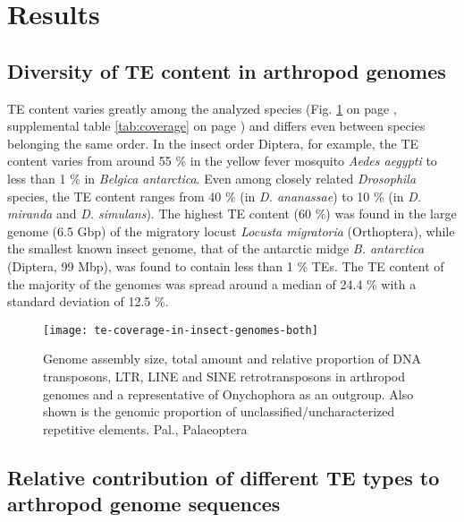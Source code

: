 \section{Results}\label{results}

\subsection{Diversity of TE content in arthropod
genomes}\label{diversity-of-te-content-in-arthropod-genomes}

TE content varies greatly among the analyzed species (Fig.
\ref{fig:te-coverage} on page \pageref{fig:te-coverage}, supplemental
table \ref{tab:coverage} on page \pageref{tab:coverage}) and differs
even between species belonging the same order. In the insect order
Diptera, for example, the TE content varies from around 55 \% in the
yellow fever mosquito \emph{Aedes aegypti} to less than 1 \% in
\emph{Belgica antarctica}. Even among closely related \emph{Drosophila}
species, the TE content ranges from 40 \% (in \emph{D. ananassae}) to 10
\% (in \emph{D. miranda} and \emph{D.  simulans}). The highest TE
content (60 \%) was found in the large genome (6.5 Gbp) of the migratory
locust \emph{Locusta migratoria} (Orthoptera), while the smallest known
insect genome, that of the antarctic midge \emph{B. antarctica}
(Diptera, 99 Mbp), was found to contain less than 1 \% TEs. The TE
content of the majority of the genomes was spread around a median of
24.4 \% with a standard deviation of 12.5 \%.

\begin{figure}[h!]
\begin{center}
\texttt{[image: te-coverage-in-insect-genomes-both]}
\caption[TE coverage (absolute and relative) in arthropod
genomes]{{Genome assembly size, total amount and relative proportion of
DNA transposons, LTR, LINE and SINE retrotransposons in arthropod
genomes and a representative of Onychophora as an outgroup. Also shown
is the genomic proportion of unclassified/uncharacterized repetitive
elements.  Pal., Palaeoptera%
}}%
\label{fig:te-coverage}%
\end{center}
\end{figure}

\subsection{Relative contribution of different TE types to arthropod
genome
sequences}\label{relative-contribution-of-different-te-types-to-arthropod-genome-sequences}

